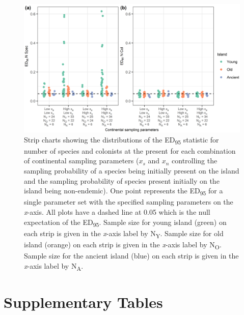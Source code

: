 \begin{figure}
    \centering
    \includegraphics{nonoceanic_sampling_parameters_num_spec_col.png}
    \caption{Strip charts showing the distributions of the ED\textsubscript{95} statistic for number of species and colonists at the present for each combination of continental sampling parameters ($x_s$ and $x_n$ controlling the sampling probability of a species being initially present on the island and the sampling probability of species present initially on the island being non-endemic). One point represents the ED\textsubscript{95} for a single parameter set with the specified sampling parameters on the \textit{x}-axis. All plots have a dashed line at 0.05 which is the null expectation of the ED\textsubscript{95}. Sample size for young island (green) on each strip is given in the \textit{x}-axis label by N\textsubscript{Y}. Sample size for old island (orange) on each strip is given in the \textit{x}-axis label by N\textsubscript{O}. Sample size for the ancient island (blue) on each strip is given in the \textit{x}-axis label by N\textsubscript{A}.}
    \label{fig:nonoceanic_sampling_parameters_num_spec_col}
\end{figure}

\clearpage

\section*{Supplementary Tables}

